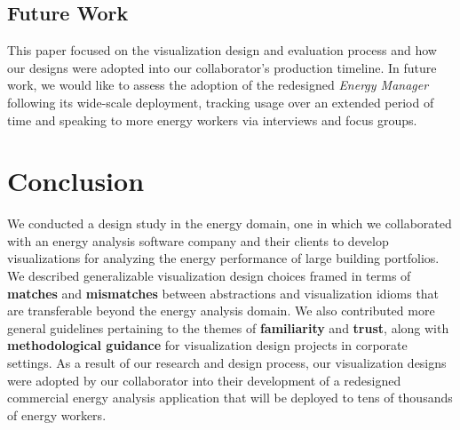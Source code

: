 \documentclass[journal]{vgtc}                %
\begin{document}

\subsection{Future Work}
\label{discussion-future-work}


This paper focused on the visualization design and evaluation process and how our designs were adopted into our collaborator's production timeline.
In future work, we would like to assess the adoption of the redesigned {\it Energy Manager} following its wide-scale deployment, tracking usage over an extended period of time and speaking to more energy workers via interviews and focus groups.


\section{Conclusion}
\label{conclusion}


We conducted a design study in the energy domain, one in which we collaborated with an energy analysis software company and their clients to develop visualizations for analyzing the energy performance of large building portfolios.
We described generalizable visualization design choices framed in terms of {\bf matches} and {\bf mismatches} between abstractions and visualization idioms that are transferable beyond the energy analysis domain.
We also contributed more general guidelines pertaining to the themes of {\bf familiarity} and {\bf trust}, along with {\bf methodological guidance} for visualization design projects in corporate settings.
As a result of our research and design process, our visualization designs were adopted by our collaborator into their development of a redesigned commercial energy analysis application that will be deployed to tens of thousands of energy workers.

\end{document}
